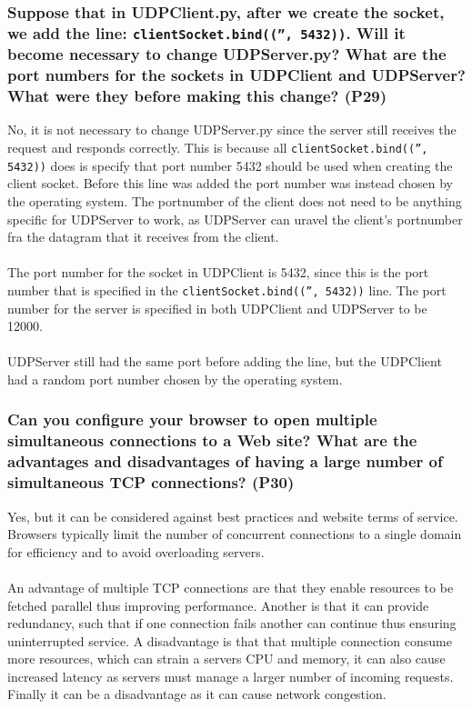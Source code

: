 \subsubsection{Suppose that in UDPClient.py, after we create the socket, we add the line:
\texttt{clientSocket.bind(('', 5432))}. Will it become necessary to change UDPServer.py? What are the port numbers for the sockets in UDPClient and UDPServer? What were they before making this change? (P29)}

No, it is not necessary to change UDPServer.py since the server still receives the request and responds correctly. This is because all \texttt{clientSocket.bind(('', 5432))} does is specify that port number 5432 should be used when creating the client socket. Before this line was added the port number was instead chosen by the operating system. The portnumber of the client does not need to be anything specific for UDPServer to work, as UDPServer can uravel the client's portnumber fra the datagram that it receives from the client. \\
\\
The port number for the socket in UDPClient is 5432, since this is the port number that is specified in the \texttt{clientSocket.bind(('', 5432))} line. The port number for the server is specified in both UDPClient and UDPServer to be 12000. \\
\\
UDPServer still had the same port before adding the line, but the UDPClient had a random port number chosen by the operating system.

\subsubsection{Can you configure your browser to open multiple simultaneous connections to a Web site? What are the advantages and disadvantages of having a large number of simultaneous TCP connections? (P30)}

Yes, but it can be considered against best practices and website terms of service. Browsers typically limit the number of concurrent connections to a single domain for efficiency and to avoid overloading servers. \\
\\
An advantage of multiple TCP connections are that they enable resources to be fetched parallel thus improving performance. Another is that it can provide redundancy, such that if one connection fails another can continue thus ensuring uninterrupted service. A disadvantage is that that multiple connection consume more resources, which can strain a servers CPU and memory, it can also cause increased latency as servers must manage a larger number of incoming requests. Finally it can be a disadvantage as it can cause network congestion.



